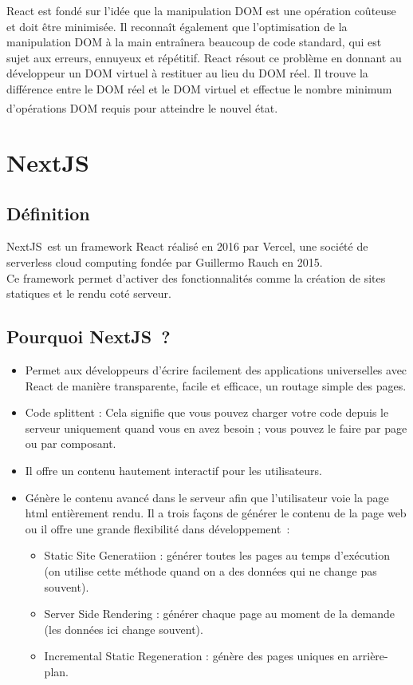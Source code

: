 \documentclass[12pt]{report}
\begin{document}
\vspace*{0.2in}
\hspace*{0.16in}
React est fondé sur l’idée que la manipulation DOM est une opération coûteuse et doit être minimisée. Il reconnaît également que l’optimisation de la manipulation DOM à la main entraînera beaucoup de code standard, qui est sujet aux erreurs, ennuyeux et répétitif. React résout ce problème en donnant au développeur un DOM virtuel à restituer au lieu du DOM réel. Il trouve la différence entre le DOM réel et le DOM virtuel et effectue le nombre minimum d’opérations DOM requis pour atteindre le nouvel état. \textsuperscript{\cite{vipul2016reactjs}}

\section{NextJS}
\subsection{Définition}
\vspace{0.1in}
\hspace*{0.16in}
NextJS est un framework React réalisé en 2016 par Vercel, une société de serverless cloud computing fondée par Guillermo Rauch en 2015.
\\
Ce framework permet d’activer des fonctionnalités comme la création de sites statiques et le rendu coté serveur.

\subsection{Pourquoi NextJS ?}
\vspace{0.1in}
\begin{itemize}
    \item Permet aux développeurs d'écrire facilement des applications universelles avec React de manière transparente, facile et efficace, un routage simple des pages.
    \item Code splittent : Cela signifie que vous pouvez charger votre code depuis le serveur uniquement quand vous en avez besoin ; vous pouvez le faire par page ou par composant.
    \item Il offre un contenu hautement interactif pour les utilisateurs.
    \item Génère le contenu avancé dans le serveur afin que l'utilisateur voie la page html entièrement rendu. Il a trois façons de générer le contenu de la page web ou il offre une grande flexibilité dans développement :
    \begin{itemize}
        \item Static Site Generatiion : générer toutes les pages au temps d’exécution (on utilise cette méthode quand on a des données qui ne change pas souvent).
        \item Server Side Rendering : générer chaque page au moment de la demande (les données ici change souvent).
        \item Incremental Static Regeneration : génère des pages uniques en arrière-plan.
    \end{itemize}
\end{itemize}
\end{document}
